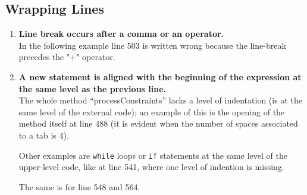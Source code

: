 \documentclass[a4paper,11pt]{report} %
\begin{document}
		\subsection*{Wrapping Lines}\begin{enumerate}[resume]
			\item \textbf{Line break occurs after a comma or an operator.}\smallskip \\
				In the following example line 503 is written wrong because the line-break precedes the "+" operator.
				
			\setcounter{enumi}{16}
			\item \textbf{A new statement is aligned with the beginning of the expression at the same level as the previous line.}\smallskip \\
				The whole method ``processConstraints'' lacks a level of indentation (is at the same level of the external code); an example of this is the opening of the method itself at line 488 (it is evident when the number of spaces associated to a tab is 4).
				
				Other examples are \texttt{while} loops or \texttt{if} statements at the same level of the upper-level code, like at line 541, where one level of indention is missing.
				
				The same is for line 548 and 564.
		\end{enumerate}
		
\end{document}
